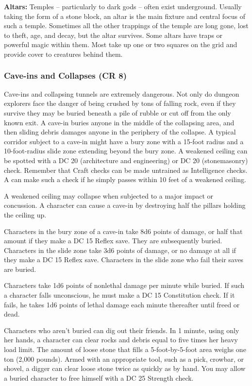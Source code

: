 \textbf{Altars:} Temples -- particularly to dark gods -- often exist underground. 
Usually taking the form of a stone block, an altar is the main fixture and central 
focus of such a temple. Sometimes all the other trappings of the temple are long 
gone, lost to theft, age, and decay, but the altar survives. Some altars have traps 
or powerful magic within them. Most take up one or two squares on the grid and 
provide cover to creatures behind them. 

\subsubsection{Cave-ins and Collapses (CR 8)}

Cave-ins and collapsing tunnels are extremely dangerous. Not only do dungeon explorers 
face the danger of being crushed by tons of falling rock, even if they survive 
they may be buried beneath a pile of rubble or cut off from the only known exit. 
A cave-in buries anyone in the middle of the collapsing area, and then sliding 
debris damages anyone in the periphery of the collapse. A typical corridor subject 
to a cave-in might have a bury zone with a 15-foot radius and a 10-foot-radius 
slide zone extending beyond the bury zone. A weakened ceiling can be spotted with 
a DC 20  (architecture and engineering) or DC 20  (stonemasonry) 
check. Remember that Craft checks can be made untrained as Intelligence checks. 
A  can make such a check if he simply passes within 10 feet of a weakened 
ceiling.

A weakened ceiling may collapse when subjected to a major impact or concussion. 
A character can cause a cave-in by destroying half the pillars holding the ceiling 
up.

Characters in the bury zone of a cave-in take 8d6 points of damage, or half that 
amount if they make a DC 15 Reflex save. They are subsequently buried. Characters 
in the slide zone take 3d6 points of damage, or no damage at all if they make a 
DC 15 Reflex save. Characters in the slide zone who fail their saves are buried.

Characters take 1d6 points of nonlethal damage per minute while buried. If such 
a character falls unconscious, he must make a DC 15 Constitution check. If it fails, 
he takes 1d6 points of lethal damage each minute thereafter until freed or dead.

Characters who aren't buried can dig out their friends. In 1 minute, using only 
her hands, a character can clear rocks and debris equal to five times her heavy 
load limit. The amount of loose stone that fills a 5-foot-by-5-foot area weighs 
one ton (2,000 pounds). Armed with an appropriate tool, such as a pick, crowbar, 
or shovel, a digger can clear loose stone twice as quickly as by hand. You may 
allow a buried character to free himself with a DC 25 Strength check.

